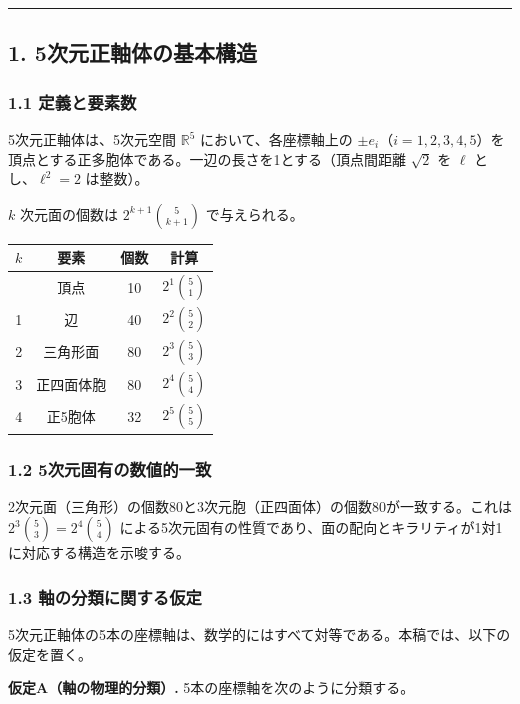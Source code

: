 \documentclass[a4paper,11pt]{ltjsarticle}
\newcounter{none}
\begin{document}
\begin{center}\rule{0.5\linewidth}{0.5pt}\end{center}

\subsection*{1. 5次元正軸体の基本構造}

\subsubsection*{1.1 定義と要素数}

5次元正軸体は、5次元空間 $\mathbb{R}^5$ において、各座標軸上の
$\pm e_i$（$i = 1, 2, 3, 4, 5$）を頂点とする正多胞体である。一辺の長さを1とする（頂点間距離
$\sqrt{2}$ を $\ell$ とし、$\ell^2 = 2$ は整数）。

$k$ 次元面の個数は $2^{k+1}\binom{5}{k+1}$ で与えられる。

{\def\LTcaptype{none}
\begin{longtable}[]{@{}cccc@{}}
\toprule
$k$ & 要素 & 個数 & 計算 \\
\midrule
\endhead
\bottomrule
\endlastfoot
0 & 頂点 & 10 & $2^1 \binom{5}{1}$ \\
1 & 辺 & 40 & $2^2 \binom{5}{2}$ \\
2 & 三角形面 & 80 & $2^3 \binom{5}{3}$ \\
3 & 正四面体胞 & 80 & $2^4 \binom{5}{4}$ \\
4 & 正5胞体 & 32 & $2^5 \binom{5}{5}$ \\
\end{longtable}
}

\subsubsection*{1.2 5次元固有の数値的一致}

2次元面（三角形）の個数80と3次元胞（正四面体）の個数80が一致する。これは
$2^3 \binom{5}{3} = 2^4 \binom{5}{4}$
による5次元固有の性質であり、面の配向とキラリティが1対1に対応する構造を示唆する。

\subsubsection*{1.3 軸の分類に関する仮定}

5次元正軸体の5本の座標軸は、数学的にはすべて対等である。本稿では、以下の仮定を置く。

\textbf{仮定A（軸の物理的分類）.} 5本の座標軸を次のように分類する。
\end{document}
